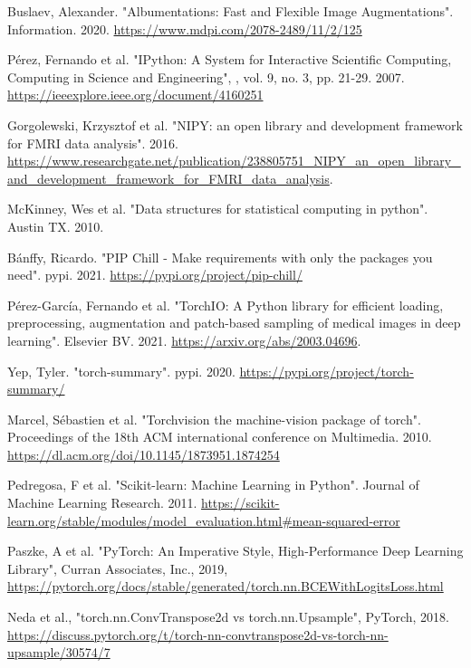 \documentclass[12pt, fleqn, titlepage]{article}
\newcommand{\1}[1]{\mathds{1}\left[#1\right]}
\begin{document}
\begin{thebibliography}{9}
		 Buslaev, Alexander. "Albumentations: Fast and Flexible Image Augmentations". Information. 2020. \url{https://www.mdpi.com/2078-2489/11/2/125}
		
		 Pérez, Fernando et al. "IPython: A System for Interactive Scientific Computing, Computing in Science and Engineering", , vol. 9, no. 3, pp. 21-29. 2007. \url{https://ieeexplore.ieee.org/document/4160251}
		
		 Gorgolewski, Krzysztof et al. "NIPY: an open library and development framework for FMRI data analysis". 2016. \url{https://www.researchgate.net/publication/238805751\_NIPY\_an\_open\_library\_and\_development\_framework\_for\_FMRI\_data\_analysis}.
		
		 McKinney, Wes et al. "Data structures for statistical computing in python". Austin TX. 2010.
		
		 Bánffy, Ricardo. "PIP Chill - Make requirements with only the packages you need". pypi. 2021. \url{https://pypi.org/project/pip-chill/}
		
		 Pérez-García, Fernando et al. "TorchIO: A Python library for efficient loading, preprocessing, augmentation and patch-based sampling of medical images in deep learning". Elsevier BV. 2021. \url{https://arxiv.org/abs/2003.04696}.	
		
		  Yep, Tyler. "torch-summary". pypi. 2020. \url{https://pypi.org/project/torch-summary/}
		
		 Marcel, Sébastien et al. "Torchvision the machine-vision package of torch". Proceedings of the 18th ACM international conference on Multimedia. 2010. \url{https://dl.acm.org/doi/10.1145/1873951.1874254}
		
		 Pedregosa, F et al. "Scikit-learn: Machine Learning in Python". Journal of Machine Learning Research. 2011. \url{https://scikit-learn.org/stable/modules/model_evaluation.html#mean-squared-error}
		
		 Paszke, A et al. "PyTorch: An Imperative Style, High-Performance Deep Learning Library", Curran Associates, Inc., 2019, \url{https://pytorch.org/docs/stable/generated/torch.nn.BCEWithLogitsLoss.html}
		
		 Neda et al., "torch.nn.ConvTranspose2d vs torch.nn.Upsample", PyTorch, 2018. \url{https://discuss.pytorch.org/t/torch-nn-convtranspose2d-vs-torch-nn-upsample/30574/7}
		

\end{thebibliography}
\end{document}

